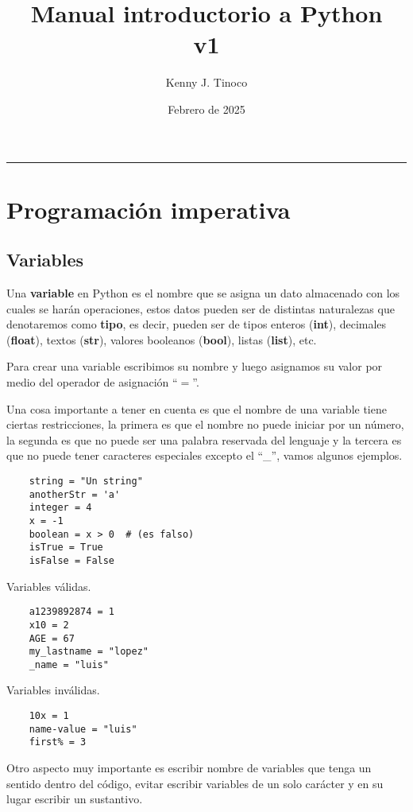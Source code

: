 \documentclass[12pt]{article}
\title{Manual introductorio a Python\\v1}
\author{Kenny J. Tinoco}
\date{Febrero de 2025}
\theoremstyle{definition}
\begin{document}
    \maketitle

    \tableofcontents

    \vspace{5mm}
    \hrule

    \section{Programación imperativa}

    \subsection{Variables}
    Una \textbf{variable} en Python es el nombre que se asigna un dato almacenado con los cuales se harán operaciones,
    estos datos pueden ser de distintas naturalezas que denotaremos como \textbf{tipo}, es decir, pueden ser de tipos
    enteros (\textbf{int}), decimales (\textbf{float}), textos (\textbf{str}), valores booleanos (\textbf{bool}), listas (\textbf{list}), etc.

    Para crear una variable escribimos su nombre y luego asignamos su valor por medio del operador de asignación ``$=$''.

    Una cosa importante a tener en cuenta es que el nombre de una variable tiene ciertas restricciones, la primera es
    que el nombre no puede iniciar por un número, la segunda es que no puede ser una palabra reservada del lenguaje y
    la tercera es que no puede tener caracteres especiales excepto el ``\_'', vamos algunos ejemplos.
    \begin{lstlisting}
    string = "Un string"
    anotherStr = 'a'
    integer = 4
    x = -1
    boolean = x > 0  # (es falso)
    isTrue = True
    isFalse = False
    \end{lstlisting}

    Variables válidas.
    \begin{lstlisting}
    a1239892874 = 1
    x10 = 2
    AGE = 67
    my_lastname = "lopez"
    _name = "luis"
    \end{lstlisting}

    Variables inválidas.
    \begin{lstlisting}
    10x = 1
    name-value = "luis"
    first% = 3
    \end{lstlisting}

    Otro aspecto muy importante es escribir nombre de variables que tenga un sentido dentro del código, evitar escribir
    variables de un solo carácter y en su lugar escribir un sustantivo.
\end{document}
